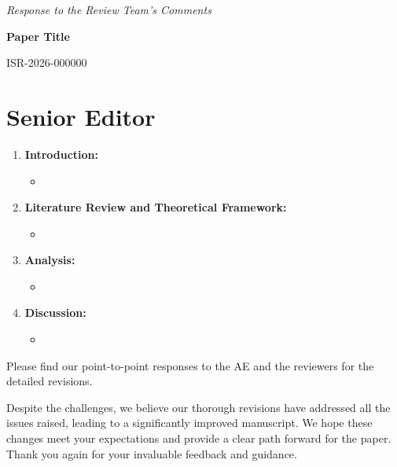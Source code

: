\documentclass{response}
\begin{document}
\begin{center}
	\Large
	\textit{Response to the Review Team's Comments}

	\textbf{Paper Title}

	ISR-2026-000000
\end{center}

\section{Senior Editor}

\begin{response}
\end{response}

\begin{response}
\end{response}

\begin{response}
	\begin{enumerate}
		\item \textbf{Introduction:}
		      \begin{itemize}
			      \item
		      \end{itemize}
		\item \textbf{Literature Review and Theoretical Framework:}
		      \begin{itemize}
			      \item
		      \end{itemize}

		\item \textbf{Analysis:}
		      \begin{itemize}
			      \item
		      \end{itemize}
		\item \textbf{Discussion:}
		      \begin{itemize}
			      \item
		      \end{itemize}
	\end{enumerate}


	Please find our point-to-point responses to the AE and the reviewers for the detailed revisions.

	Despite the challenges, we believe our thorough revisions have addressed all the issues raised, leading to a significantly improved manuscript. We hope these changes meet your expectations and provide a clear path forward for the paper. Thank you again for your invaluable feedback and guidance.
\end{response}
\end{document}

